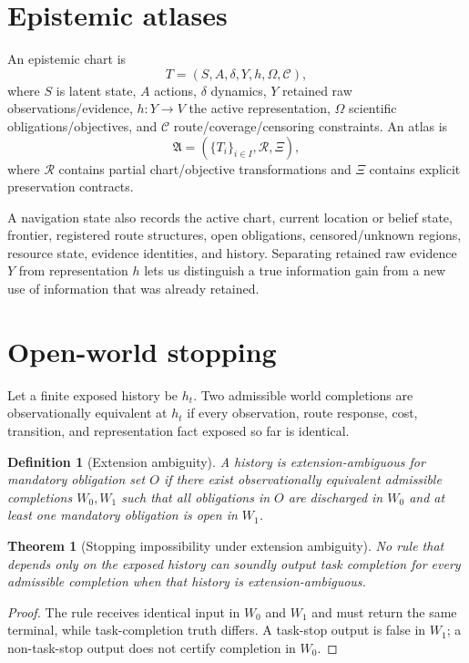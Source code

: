 \documentclass[11pt]{article}
\newtheorem{theorem}{Theorem}
\newtheorem{definition}{Definition}
\begin{document}
\section{Epistemic atlases}
An epistemic chart is
\[
T=(S,A,\delta,Y,h,\Omega,\mathcal C),
\]
where $S$ is latent state, $A$ actions, $\delta$ dynamics, $Y$ retained raw observations/evidence, $h:Y\rightarrow V$ the active representation, $\Omega$ scientific obligations\slash objectives, and $\mathcal C$ route\slash coverage\slash censoring constraints. An atlas is
\[
\mathfrak A=(\{T_i\}_{i\in I},\mathcal R,\Xi),
\]
where $\mathcal R$ contains partial chart/objective transformations and $\Xi$ contains explicit preservation contracts.

A navigation state also records the active chart, current location or belief state, frontier, registered route structures, open obligations, censored/unknown regions, resource state, evidence identities, and history. Separating retained raw evidence $Y$ from representation $h$ lets us distinguish a true information gain from a new use of information that was already retained.

\section{Open-world stopping}
Let a finite exposed history be $h_t$. Two admissible world completions are observationally equivalent at $h_t$ if every observation, route response, cost, transition, and representation fact exposed so far is identical.

\begin{definition}[Extension ambiguity]
A history is extension-ambiguous for mandatory obligation set $O$ if there exist observationally equivalent admissible completions $W_0,W_1$ such that all obligations in $O$ are discharged in $W_0$ and at least one mandatory obligation is open in $W_1$.
\end{definition}

\begin{theorem}[Stopping impossibility under extension ambiguity]
No rule that depends only on the exposed history can soundly output task completion for every admissible completion when that history is extension-ambiguous.
\end{theorem}
\begin{proof}
The rule receives identical input in $W_0$ and $W_1$ and must return the same terminal, while task-completion truth differs. A task-stop output is false in $W_1$; a non-task-stop output does not certify completion in $W_0$.
\end{proof}
\end{document}
